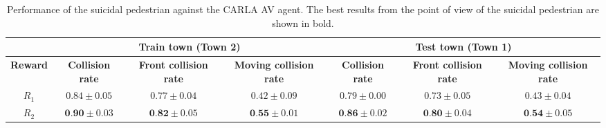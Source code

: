 \documentclass[letterpaper, 10 pt, conference]{ieeeconf}
\newcommand{\Rs}{R_1}
\newcommand{\Rc}{R_2}
\begin{document}
\begin{table*}[h]
    \caption{Performance of the suicidal pedestrian against the CARLA AV agent.
    The best results from the point of view of the suicidal pedestrian are shown in bold.} %
    \centering
    \begin{tabular}{c|ccc|ccc}
        \hline
        & \multicolumn{3}{c}{\textbf{Train town (Town 2)}} & \multicolumn{3}{|c}{\textbf{Test town (Town 1)}} \\ \hline
        \textbf{Reward} & \textbf{Collision rate} & \textbf{Front collision rate} &  \textbf{Moving collision rate} & \textbf{Collision rate} & \textbf{Front collision rate} & \textbf{Moving collision rate} \\ \hline

        $\Rs$ & $0.84 \pm 0.05$ & $0.77 \pm 0.04$ & $0.42 \pm 0.09$ & $0.79 \pm 0.00$ & $0.73 \pm 0.05$ & $0.43 \pm 0.04$ \\
        $\Rc$ &$\textbf{0.90} \pm 0.03$ & $\textbf{0.82} \pm 0.05$ & $\textbf{0.55} \pm 0.01$ & $\textbf{0.86} \pm 0.02$ & $\textbf{0.80} \pm 0.04$ & $\textbf{0.54} \pm 0.05$ \\

        \hline


    \end{tabular}
    \label{tab:pedestrian_evaluation}
\end{table*}
\end{document}
